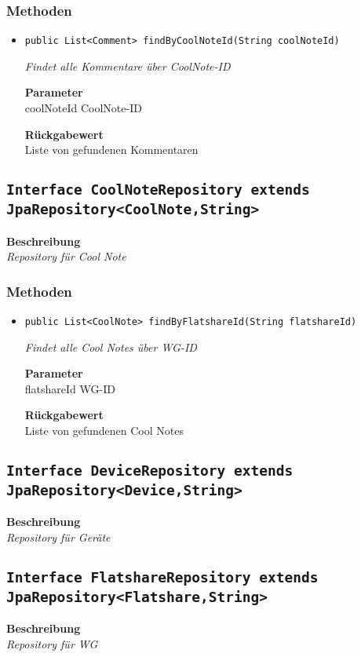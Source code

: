     \subsubsection*{Methoden}
    \begin{itemize}
    	\item{\texttt{public List<Comment> findByCoolNoteId(String coolNoteId)}}
    	
    	\textit{Findet alle Kommentare über CoolNote-ID}
    	
    	\textbf{Parameter} \\
    	coolNoteId CoolNote-ID
    	
    	\textbf{Rückgabewert} \\
    	Liste von gefundenen Kommentaren
    \end{itemize}
    \subsection{\texttt{Interface CoolNoteRepository extends JpaRepository<CoolNote,String>}}
    \textbf{Beschreibung} \\
    \textit{Repository für Cool Note}
    \subsubsection*{Methoden}
    \begin{itemize}
    	\item{\texttt{public List<CoolNote> findByFlatshareId(String flatshareId)}}
    	
    	\textit{Findet alle Cool Notes über WG-ID}
    	
    	\textbf{Parameter} \\
    	flatshareId WG-ID
    	
    	\textbf{Rückgabewert} \\
    	Liste von gefundenen Cool Notes
    \end{itemize}
    \subsection{\texttt{Interface DeviceRepository extends JpaRepository<Device,String>}}
    \textbf{Beschreibung} \\
    \textit{Repository für Geräte}
    \subsection{\texttt{Interface FlatshareRepository extends JpaRepository<Flatshare,String>}}
    \textbf{Beschreibung} \\
    \textit{Repository für WG}
